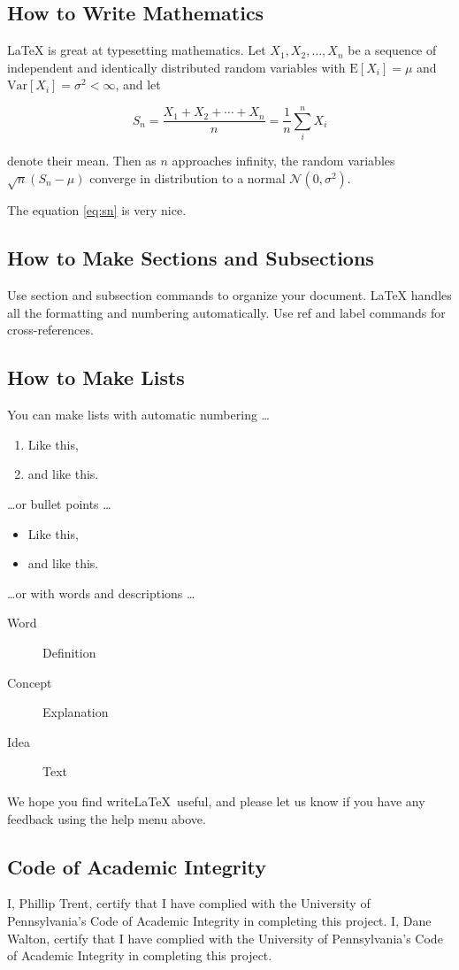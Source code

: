 \documentclass[a4paper]{article}
\begin{document}
\subsection{How to Write Mathematics}

\LaTeX{} is great at typesetting mathematics. Let $X_1, X_2, \ldots, X_n$ be a sequence of independent and identically distributed random variables with $\text{E}[X_i] = \mu$ and $\text{Var}[X_i] = \sigma^2 < \infty$, and let

\begin{equation}
S_n = \frac{X_1 + X_2 + \cdots + X_n}{n}
      = \frac{1}{n}\sum_{i}^{n} X_i
\label{eq:sn}
\end{equation}

denote their mean. Then as $n$ approaches infinity, the random variables $\sqrt{n}(S_n - \mu)$ converge in distribution to a normal $\mathcal{N}(0, \sigma^2)$.

The equation \ref{eq:sn} is very nice.

\subsection{How to Make Sections and Subsections}

Use section and subsection commands to organize your document. \LaTeX{} handles all the formatting and numbering automatically. Use ref and label commands for cross-references.

\subsection{How to Make Lists}

You can make lists with automatic numbering \dots

\begin{enumerate}
\item Like this,
\item and like this.
\end{enumerate}
\dots or bullet points \dots
\begin{itemize}
\item Like this,
\item and like this.
\end{itemize}
\dots or with words and descriptions \dots
\begin{description}
\item[Word] Definition
\item[Concept] Explanation
\item[Idea] Text
\end{description}

We hope you find write\LaTeX\ useful, and please let us know if you have any feedback using the help menu above.


\subsection{Code of Academic Integrity}
I, Phillip Trent, certify that I have complied with the University of Pennsylvania’s Code of Academic Integrity in completing this project.
I, Dane Walton, certify that I have complied with the University of Pennsylvania’s Code of Academic Integrity in completing this project.
\end{document}
